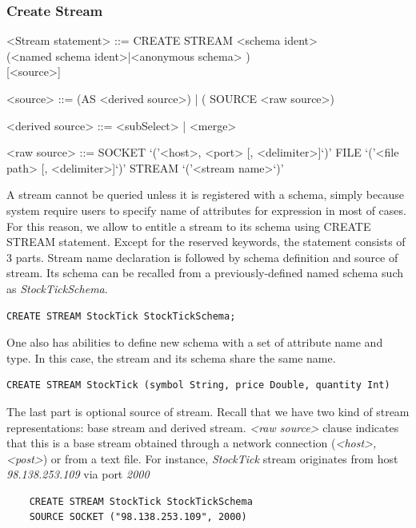\subsubsection{Create Stream} \label{query:createStream}
	
					
\begin{grammar}
<Stream statement> ::= CREATE STREAM <schema ident> \\		(<named schema ident>|<anonymous schema> ) \\
{ }[<source>]

<source> ::= (AS <derived source>) | ( SOURCE <raw source>)

<derived source> ::=   <subSelect> | <merge>

<raw source> ::= 
				SOCKET `('<host>, <port> [, <delimiter>]`)'
					\alt FILE `('<file path> [, <delimiter>]`)'
					\alt STREAM `('<stream name>`)'
\end{grammar}

A stream cannot be queried unless it is registered with a schema, simply because system require users to specify name of attributes for expression in most of cases. For this reason, we allow to entitle a stream to its schema using CREATE STREAM statement. Except for the reserved keywords, the statement consists of 3 parts. Stream name declaration is followed by schema definition and source of stream. Its schema can be recalled from a previously-defined named schema such as \textit{StockTickSchema}. 
\begin{verbatim}
CREATE STREAM StockTick StockTickSchema;
\end{verbatim}

One also has abilities to define new schema with a set of attribute name and type. In this case, the stream and its schema share the same name.
\begin{verbatim}
CREATE STREAM StockTick (symbol String, price Double, quantity Int)
\end{verbatim}

The last part is optional source of stream. Recall that we have two kind of stream representations: base stream and derived stream. \textit{<raw source>} clause indicates that this is a base stream obtained through a network connection (\textit{<host>, <post>}) or from a text file. For instance, \textit{StockTick} stream originates from host \textit{98.138.253.109} via port \textit{2000}

\begin{verbatim} 
	CREATE STREAM StockTick StockTickSchema 
	SOURCE SOCKET ("98.138.253.109", 2000)
\end{verbatim}


